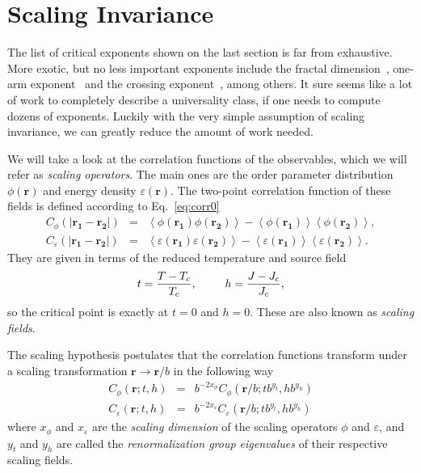 \section{Scaling Invariance}
\label{sec:scalinginv}
\renewcommand{\op}{\phi}

The list of critical exponents shown on the last section is far from
exhaustive. More exotic, but no less important exponents include the fractal
dimension~\cite{Voss1984}, one-arm exponent~\cite{Lawler2001b} and the crossing
exponent~\cite{Aizenman1999}, among others. It sure seems like a lot of work to
completely describe a universality class, if one needs to compute dozens of
exponents. Luckily with the very simple assumption of scaling invariance, we
can greatly reduce the amount of work needed.

We will take a look at the correlation functions of the observables, which
we will refer as \textit{scaling operators}. The main ones are the order
parameter distribution $\op(\mathbf{r})$ and energy density
$\varepsilon(\mathbf{r})$. The two-point correlation function of these fields is
defined according to Eq.~\ref{eq:corr0}
\begin{eqnarray}
    \label{eq:corr10}
    C_{\op}\left(\left|\mathbf{r_1}-\mathbf{r_2}\right|\right) & = &
    \left\langle
        \op\left(\mathbf{r_{1}}\right)
        \op\left(\mathbf{r_{2}}\right)
    \right\rangle -
    \left\langle
        \op\left(\mathbf{r_{1}}\right)
    \right\rangle
    \left\langle
        \op\left(\mathbf{r_{2}}\right)
    \right\rangle,
    \\
    \label{eq:corr11}
    C_{\varepsilon}\left(\left|\mathbf{r_1}-\mathbf{r_2}\right|\right) & = &
    \left\langle
        \varepsilon\left(\mathbf{r_{1}}\right)
        \varepsilon\left(\mathbf{r_{2}}\right)
    \right\rangle-
    \left\langle
        \varepsilon\left(\mathbf{r_{1}}\right)
    \right\rangle
    \left\langle
        \varepsilon\left(\mathbf{r_{2}}\right)
    \right\rangle.
\end{eqnarray}
They are given in terms of the reduced temperature and source field
\begin{equation}
    t=\frac{T-T_c}{T_c},\;\;\;\;\;\;\;\;\;h=\frac{J-J_c}{J_c},
\end{equation}
so the critical point is exactly at $t=0$ and $h=0$. These are also known
as \textit{scaling fields}.

The scaling hypothesis postulates that the correlation functions transform
under a scaling transformation $\mathbf{r}\rightarrow\mathbf{r}/b$ in the
following way
\begin{eqnarray}
    \label{eq:scal}
    C_{\op}\left(\mathbf{r};t,h\right) & = &
    b^{-2x_{\op}}C_{\op}\left(\mathbf{r}/b;tb^{y_{t}},hb^{y_{h}}\right)\\
    \label{eq:scal10}
    C_{\varepsilon}\left(\mathbf{r};t,h\right) & = &
    b^{-2x_{\varepsilon}}C_{\varepsilon}\left(\mathbf{r}/b;tb^{y_{t}},hb^{y_{h}}\right)
\end{eqnarray}
where $x_\op$ and $x_\varepsilon$ are the \textit{scaling dimension} of the
scaling operators $\op$ and $\varepsilon$, and $y_t$ and $y_h$ are called the
\textit{renormalization group eigenvalues} of their respective scaling fields.

